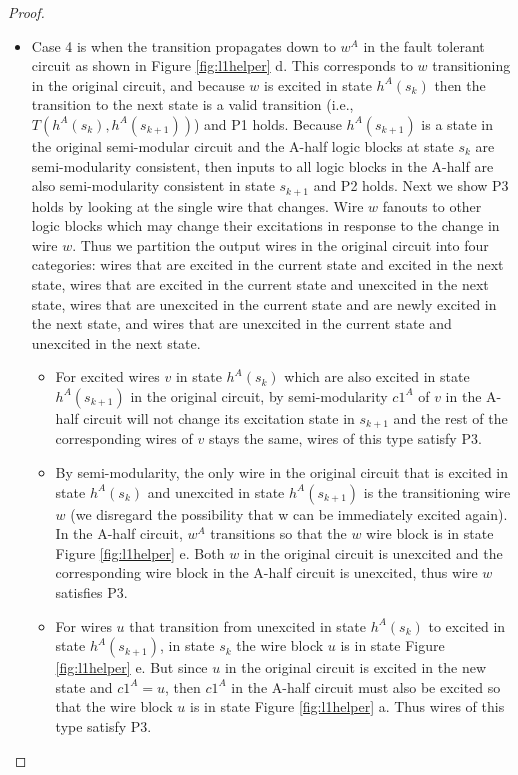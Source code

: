 \documentclass[12pt]{report}
\begin{document}
\begin{proof}
\begin{itemize}
\item Case 4 is when the transition propagates down to $w^A$ in the fault tolerant circuit as shown in Figure \ref{fig:l1helper} d.  This corresponds to $w$ transitioning in the original circuit, and because $w$ is excited in state $h^A(s_k)$ then the transition to the next state is a valid transition (i.e., $T(h^A(s_k), h^A(s_{k+1}))$) and P1 holds.  Because $h^A(s_{k+1})$ is a state in the original semi-modular circuit and the A-half logic blocks at state $s_k$ are semi-modularity consistent, then inputs to all logic blocks in the A-half are also semi-modularity consistent in state $s_{k+1}$ and P2 holds. Next we show P3 holds by looking at the single wire that changes.  Wire $w$ fanouts to other logic blocks which may change their excitations in response to the change in wire $w$.  Thus we partition the output wires in the original circuit into four categories: wires that are excited in the current state and excited in the next state, wires that are excited in the current state and unexcited in the next state, wires that are unexcited in the current state and are newly excited in the next state, and wires that are unexcited in the current state and unexcited in the next state.
\begin{itemize}
\item
For excited wires $v$ in state $h^A(s_k)$ which are also excited in state $h^A(s_{k+1})$ in the original circuit, by semi-modularity $c1^A$ of $v$ in the A-half circuit will not change its excitation state in $s_{k+1}$ and the rest of the corresponding wires of $v$ stays the same, wires of this type satisfy P3.   %
\item
By semi-modularity, the only wire in the original circuit that is excited in state $h^A(s_{k})$ and unexcited in state $h^A(s_{k+1})$ is the transitioning wire $w$ (we disregard the possibility that w can be immediately excited again).  In the A-half circuit, $w^A$ transitions so that the $w$ wire block is in state Figure \ref{fig:l1helper} e.  Both $w$ in the original circuit is unexcited and the corresponding wire block in the A-half circuit is unexcited, thus wire $w$ satisfies P3.  
\item
For wires $u$ that transition from unexcited in state $h^A(s_{k})$ to excited in state $h^A(s_{k+1})$, in state $s_{k}$ the wire block $u$ is in state Figure \ref{fig:l1helper} e.  But since $u$ in the original circuit is excited in the new state and $c1^A=u$, then $c1^A$ in the A-half circuit must also be excited so that the wire block $u$ is in state Figure \ref{fig:l1helper} a.  Thus wires of this type satisfy P3. 

\end{itemize}
\end{itemize}
\end{proof}
\end{document}
